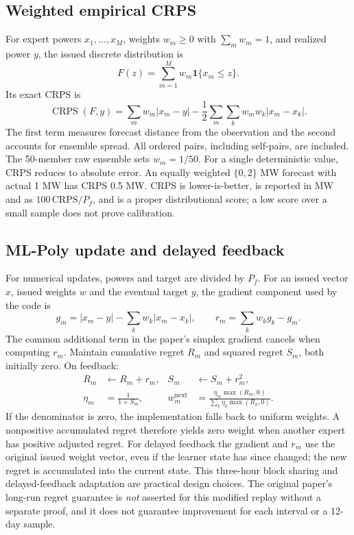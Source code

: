\documentclass[11pt,a4paper]{article}
\begin{document}
\subsection{Weighted empirical CRPS}
For expert powers $x_1,\ldots,x_M$, weights $w_m\ge0$ with $\sum_mw_m=1$, and realized power $y$, the issued discrete distribution is
\begin{equation} F(z)=\sum_{m=1}^{M}w_m\mathbf 1\{x_m\le z\}.\end{equation}
Its exact CRPS is
\begin{equation}\label{eq:crps}
\operatorname{CRPS}(F,y)=\sum_mw_m|x_m-y|-\frac12\sum_m\sum_k w_mw_k|x_m-x_k|.
\end{equation}
The first term measures forecast distance from the observation and the second accounts for ensemble spread. All ordered pairs, including self-pairs, are included. The 50-member raw ensemble sets $w_m=1/50$. For a single deterministic value, CRPS reduces to absolute error. An equally weighted $\{0,2\}$ MW forecast with actual 1 MW has CRPS 0.5 MW. CRPS is lower-is-better, is reported in MW and as $100\,\mathrm{CRPS}/P_f$, and is a proper distributional score; a low score over a small sample does not prove calibration.

\subsection{ML-Poly update and delayed feedback}
For numerical updates, powers and target are divided by $P_f$. For an issued vector $x$, issued weights $w$ and the eventual target $y$, the gradient component used by the code is
\begin{equation}
 g_m=|x_m-y|-\sum_k w_k|x_m-x_k|,\qquad r_m=\sum_k w_k g_k-g_m.
\end{equation}
The common additional term in the paper's simplex gradient cancels when computing $r_m$. Maintain cumulative regret $R_m$ and squared regret $S_m$, both initially zero. On feedback:
\begin{align}
 R_m&\leftarrow R_m+r_m, & S_m&\leftarrow S_m+r_m^2,\\
 \eta_m&=\frac{1}{1+S_m}, & w_m^{\mathrm{next}}&=\frac{\eta_m\max(R_m,0)}{\sum_k\eta_k\max(R_k,0)}.
\end{align}
If the denominator is zero, the implementation falls back to uniform weights. A nonpositive accumulated regret therefore yields zero weight when another expert has positive adjusted regret. For delayed feedback the gradient and $r_m$ use the original issued weight vector, even if the learner state has since changed; the new regret is accumulated into the current state. This three-hour block sharing and delayed-feedback adaptation are practical design choices. The original paper's long-run regret guarantee is \emph{not} asserted for this modified replay without a separate proof, and it does not guarantee improvement for each interval or a 12-day sample.
\end{document}
